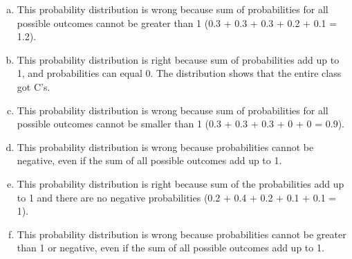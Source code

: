 
{
\begin{enumerate}[(a)]
\setlength{\itemsep}{0mm}
\item This probability distribution is wrong because sum of probabilities for all possible outcomes cannot be greater than 1 (0.3 + 0.3 + 0.3 + 0.2 + 0.1 = 1.2).
\item This probability distribution is right because sum of probabilities add up to 1, and probabilities can equal 0. The distribution shows that the entire class got C's.
\item This probability distribution is wrong because sum of probabilities for all possible outcomes cannot be smaller than 1 (0.3 + 0.3 + 0.3 + 0 + 0 = 0.9).
\item This probability distribution is wrong because probabilities cannot be negative, even if the sum of all possible outcomes add up to 1.
\item This probability distribution is right because sum of the probabilities add up to 1 and there are no negative probabilities (0.2 + 0.4 + 0.2 + 0.1 + 0.1 = 1).
\item This probability distribution is wrong because probabilities cannot be greater than 1 or negative, even if the sum of all possible outcomes add up to 1.
\end{enumerate}
}


